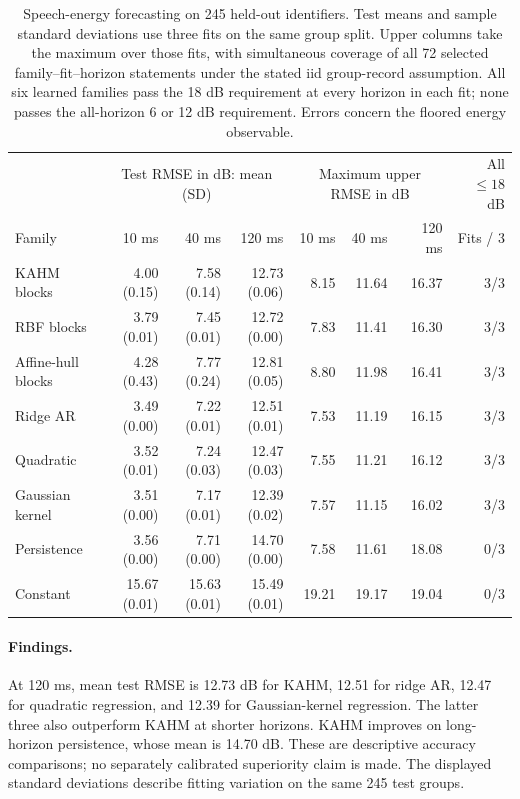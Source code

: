 \begin{table}[t]
\centering\small
\setlength{\tabcolsep}{3pt}
\begin{tabular}{lrrrrrrr}
\toprule
& \multicolumn{3}{c}{Test RMSE in dB: mean (SD)} & \multicolumn{3}{c}{Maximum upper RMSE in dB} & All $\leq18$ dB\\
Family & 10 ms & 40 ms & 120 ms & 10 ms & 40 ms & 120 ms & Fits / 3\\
\midrule
KAHM blocks & 4.00 (0.15) & 7.58 (0.14) & 12.73 (0.06) & 8.15 & 11.64 & 16.37 & 3/3\\
RBF blocks & 3.79 (0.01) & 7.45 (0.01) & 12.72 (0.00) & 7.83 & 11.41 & 16.30 & 3/3\\
Affine-hull blocks & 4.28 (0.43) & 7.77 (0.24) & 12.81 (0.05) & 8.80 & 11.98 & 16.41 & 3/3\\
Ridge AR & 3.49 (0.00) & 7.22 (0.01) & 12.51 (0.01) & 7.53 & 11.19 & 16.15 & 3/3\\
Quadratic & 3.52 (0.01) & 7.24 (0.03) & 12.47 (0.03) & 7.55 & 11.21 & 16.12 & 3/3\\
Gaussian kernel & 3.51 (0.00) & 7.17 (0.01) & 12.39 (0.02) & 7.57 & 11.15 & 16.02 & 3/3\\
Persistence & 3.56 (0.00) & 7.71 (0.00) & 14.70 (0.00) & 7.58 & 11.61 & 18.08 & 0/3\\
Constant & 15.67 (0.01) & 15.63 (0.01) & 15.49 (0.01) & 19.21 & 19.17 & 19.04 & 0/3\\
\bottomrule
\end{tabular}
\caption{Speech-energy forecasting on 245 held-out identifiers. Test means and sample standard deviations use three fits on the same group split. Upper columns take the maximum over those fits, with simultaneous coverage of all 72 selected family--fit--horizon statements under the stated iid group-record assumption. All six learned families pass the 18 dB requirement at every horizon in each fit; none passes the all-horizon 6 or 12 dB requirement. Errors concern the floored energy observable.}
\label{tab:speech}
\end{table}


\paragraph{Findings.}
At 120 ms, mean test RMSE is 12.73 dB for KAHM, 12.51 for ridge AR,
12.47 for quadratic regression, and 12.39 for Gaussian-kernel regression.
The latter three also outperform KAHM at shorter horizons. KAHM improves
on long-horizon persistence, whose mean is 14.70 dB. These are descriptive
accuracy comparisons; no separately calibrated superiority claim is made.
The displayed standard deviations describe fitting variation on the same
245 test groups.

